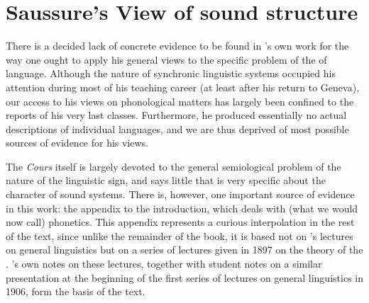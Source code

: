 \chapter{Saussure's View of sound structure}
\label{ch.saussure_sound}

There is a decided lack of concrete evidence to be found in {\Saussure}'s
own work for the way one ought to apply his general views to the
specific problem of the  of language. Although the
nature of synchronic linguistic systems occupied his attention during
most of his teaching career (at least after his return to Geneva), our
access to his views on phonological matters has largely been confined
to the reports of his very last classes. Furthermore, he produced
essentially no actual descriptions of individual languages, and we are
thus deprived of most possible sources of evidence for his views.

The \textsl{Cours} itself is largely devoted to the general semiological
problem of the nature of the linguistic sign, and says little that is
very specific about the character of sound systems. There is, however,
one important source of evidence in this work: the appendix to the
introduction, which deals with (what we would now call)
phonetics. This appendix represents a curious interpolation in the
rest of the text, since unlike the remainder of the book, it is based
not on {\Saussure}'s lectures on general linguistics but on a series of
lectures given in 1897 on the theory of the . {\Bally}'s own
notes on these lectures, together with student notes on a similar
presentation at the beginning of the first series of lectures on
general linguistics in 1906, form the basis of the text.


